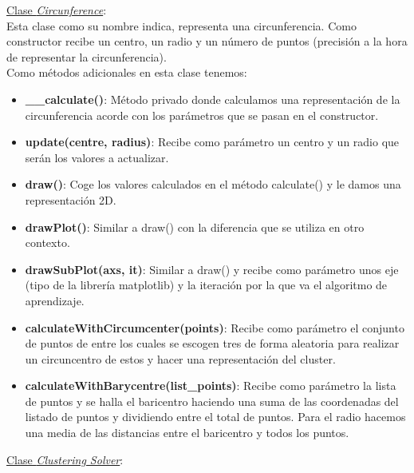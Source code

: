 \documentclass[conference,a4paper]{IEEEtran}
\begin{document}
\underline{Clase \textit{Circunference}}:\\

Esta clase como su nombre indica, representa una circunferencia. Como constructor recibe un centro, un radio y un número de puntos (precisión a la hora de representar la circunferencia).\\

Como métodos adicionales en esta clase tenemos:\\

\begin{itemize}

	\item{\textbf{\_\_calculate()}: Método privado donde calculamos una representación de la circunferencia acorde con los parámetros que se pasan en el constructor.}\\
	\item{\textbf{update(centre, radius)}: Recibe como parámetro un centro y un radio que serán los valores a actualizar.}\\
	\item{\textbf{draw()}: Coge los valores calculados en el método calculate() y le damos una representación 2D. }\\
	\item{\textbf{drawPlot()}: Similar a draw() con la diferencia que se utiliza en otro contexto.}\\
	\item{\textbf{drawSubPlot(axs, it)}: Similar a draw() y recibe como parámetro unos eje (tipo de la librería matplotlib) y la iteración por la que va el algoritmo de aprendizaje.}\\
	\item{\textbf{calculateWithCircumcenter(points)}: Recibe como parámetro el conjunto de puntos de entre los cuales se escogen tres de forma aleatoria para realizar un circuncentro de estos y hacer una representación del cluster.}\\
	\item{\textbf{calculateWithBarycentre(list\_points)}: Recibe como parámetro la lista de puntos y se halla el baricentro haciendo una suma de las coordenadas del listado de puntos y dividiendo entre el total de puntos.  Para el radio hacemos una media de las distancias entre el baricentro y todos los puntos.}\\

\end{itemize}


\clearpage
\underline{Clase \textit{Clustering Solver}}:\\
\end{document}
